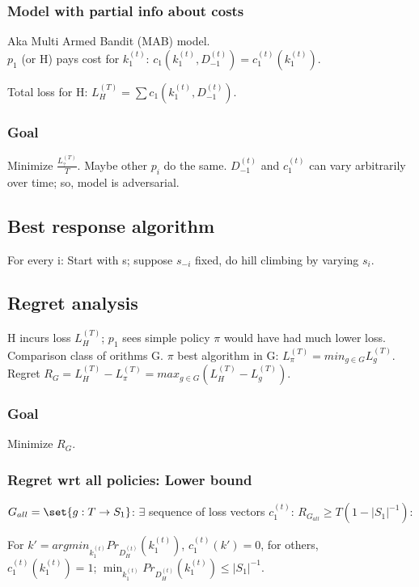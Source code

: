\documentclass[oneside, article]{memoir}
\begin{document}
\subsubsection{Model with partial info about costs}
Aka Multi Armed Bandit (MAB) model.\\
$p_{1}$ (or H) pays cost for $k_{1}^{(t)}$: $c_{1}(k_{1}^{(t)}, D_{-1}^{(t)}) = c_{1}^{(t)}(k_{1}^{(t)})$.

Total loss for H: $L_{H}^{(T)} = \sum c_{1}(k_{1}^{(t)}, D_{-1}^{(t)})$.

\subsubsection{Goal}
Minimize $\frac{L_{?}^{(T)}}{T}$. Maybe other $p_{i}$ do the same. $D_{-1}^{(t)}$ and $c_{1}^{(t)}$ can vary arbitrarily over time; so, model is adversarial.

\subsection{Best response algorithm} For every i: Start with s; suppose $s_{-i}$ fixed, do hill climbing by varying $s_{i}$.

\subsection{Regret analysis}
H incurs loss $L_{H}^{(T)}$; $p_{1}$ sees simple policy $\pi$ would have had much lower loss. Comparison class of orithms G. $\pi$ best algorithm in G: $L_{\pi}^{(T)} = min_{g \in G} L_{g}^{(T)}$. Regret $R_{G} = L_{H}^{(T)} - L_{\pi}^{(T)} = max_{g \in G} (L_{H}^{(T)} - L_{g}^{(T)})$.

\subsubsection{Goal}
Minimize $R_{G}$.

\subsubsection{Regret wrt all policies: Lower bound}
$G_{all} = \set{g: T \to S_{1}}$: $\exists$ sequence of loss vectors $c_{1}^{(t)}$: $R_{G_{all}} \geq T(1-|S_{1}|^{-1})$:

For $k' = argmin_{k_{1}^{(t)}} Pr_{D_{H}^{(t)}}(k_{1}^{(t)})$, $c_{1}^{(t)}(k') = 0$, for others, \\
$c_{1}^{(t)}(k_{1}^{(t)}) = 1$; $\min_{k_{1}^{(t)}} Pr_{D_{H}^{(t)}}(k_{1}^{(t)}) \leq |S_{1}|^{-1}$.
\end{document}
